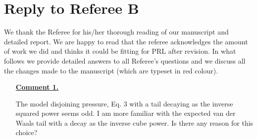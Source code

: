 \documentclass[12pt,english]{article}
\begin{document}


\section*{Reply to Referee B}

We thank the Referee for his/her thorough reading of our manuscript and detailed report.
We are happy to read that the referee acknowledges the amount of work we did and thinks it could be fitting for PRL after revision.
In what follows we provide detailed answers to all Referee's questions and we discuss all the changes made to the manuscript
(which are typeset in red colour).

\begin{itemize}


\item[ \textbf{\underline{Comment 1.}}]
{
The model disjoining pressure, Eq. 3 with a tail decaying as the
inverse squared power seems odd. I am more familiar with the expected
van der Waals tail with a decay as the inverse cube power. Is there
any reason for this choice?

}
\end{itemize}
\end{document}
